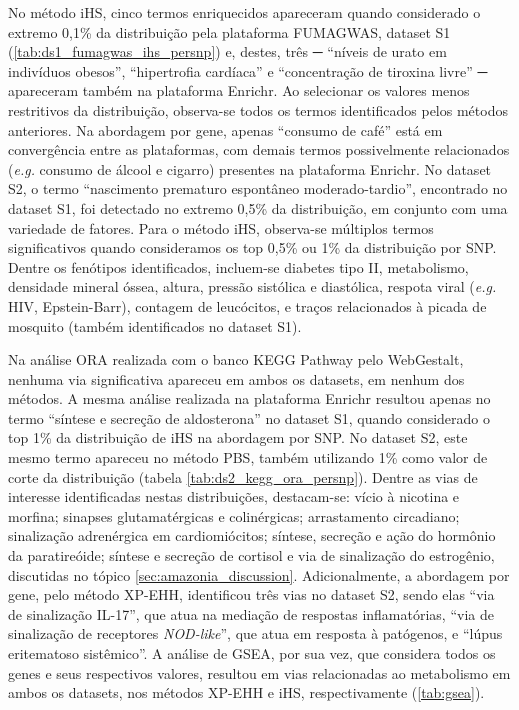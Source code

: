 \newpage

No método iHS, cinco termos enriquecidos apareceram quando considerado o extremo 0,1\% da distribuição pela plataforma FUMAGWAS, dataset S1 (\autoref{tab:ds1_fumagwas_ihs_persnp}) e, destes, três ─ “níveis de urato em indivíduos obesos”, “hipertrofia cardíaca” e “concentração de tiroxina livre” ─ apareceram também na plataforma Enrichr. Ao selecionar os valores  menos restritivos da distribuição, observa-se todos os termos identificados pelos métodos anteriores. Na abordagem por gene, apenas “consumo de café” está em convergência entre as plataformas, com demais termos possivelmente relacionados (\emph{e.g.} consumo de álcool e cigarro) presentes na plataforma Enrichr. No dataset S2, o termo “nascimento prematuro espontâneo moderado-tardio”, encontrado no dataset S1, foi detectado no extremo 0,5\% da distribuição, em conjunto com uma variedade de fatores. Para o método iHS, observa-se múltiplos termos significativos quando consideramos os top 0,5\% ou 1\% da distribuição por SNP. Dentre os fenótipos identificados, incluem-se diabetes tipo II, metabolismo, densidade mineral óssea, altura, pressão sistólica e diastólica, respota viral (\emph{e.g.} HIV, Epstein-Barr), contagem de leucócitos, e traços relacionados à picada de mosquito (também identificados no dataset S1).


\newpage

Na análise ORA realizada com o banco KEGG Pathway pelo WebGestalt, nenhuma via significativa apareceu em ambos os datasets, em nenhum dos métodos. A mesma análise realizada na plataforma Enrichr resultou apenas no termo “síntese e secreção de aldosterona” no dataset S1, quando considerado o top 1\% da distribuição de iHS na abordagem por SNP. No dataset S2, este mesmo termo apareceu no método PBS, também utilizando 1\% como valor de corte da distribuição (tabela \ref{tab:ds2_kegg_ora_persnp}). Dentre as vias de interesse identificadas nestas distribuições, destacam-se: vício à nicotina e morfina; sinapses glutamatérgicas e colinérgicas; arrastamento circadiano; sinalização adrenérgica em cardiomiócitos; síntese, secreção e ação do hormônio da paratireóide; síntese e secreção de cortisol e via de sinalização do estrogênio, discutidas no tópico \ref{sec:amazonia_discussion}. Adicionalmente, a abordagem por gene, pelo método XP-EHH, identificou três vias no dataset S2, sendo elas “via de sinalização IL-17”, que atua na mediação de respostas inflamatórias, “via de sinalização de receptores \textit{NOD-like}”, que atua em resposta à patógenos, e “lúpus eritematoso sistêmico”. A análise de GSEA, por sua vez, que considera todos os genes e seus respectivos valores, resultou em vias relacionadas ao metabolismo em ambos os datasets, nos métodos XP-EHH e iHS, respectivamente (\autoref{tab:gsea}).

